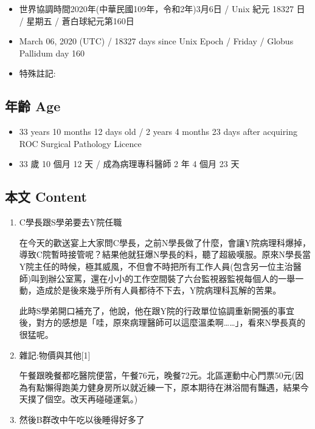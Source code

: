 \documentclass[a5paper, 12pt
]{book}
\providecommand{\tightlist}{%
  \setlength{\itemsep}{0pt}\setlength{\parskip}{0pt}}
\begin{document}
\begin{itemize}
\tightlist
\item
  世界協調時間2020年(中華民國109年，令和2年)3月6日 / Unix 紀元 18327 日
  / 星期五 / 蒼白球紀元第160日
\item
  March 06, 2020 (UTC) / 18327 days since Unix Epoch / Friday / Globus
  Pallidum day 160
\item
  特殊註記:
\end{itemize}

\hypertarget{ux5e74ux9f61-age-5}{%
\subsection{年齡 Age}\label{ux5e74ux9f61-age-5}}

\begin{itemize}
\tightlist
\item
  33 years 10 months 12 days old / 2 years 4 months 23 days after
  acquiring ROC Surgical Pathology Licence
\item
  33 歲 10 個月 12 天 / 成為病理專科醫師 2 年 4 個月 23 天
\end{itemize}

\hypertarget{ux672cux6587-content-5}{%
\subsection{本文 Content}\label{ux672cux6587-content-5}}

\begin{enumerate}
\def\labelenumi{\arabic{enumi}.}
\item
  C學長跟S學弟要去Y院任職

  在今天的歡送宴上大家問C學長，之前N學長做了什麼，會讓Y院病理科爆掉，導致C院暫時接管呢？結果他就狂爆N學長的料，聽了超級嘆服。原來N學長當Y院主任的時候，極其威風，不但會不時把所有工作人員(包含另一位主治醫師)叫到辦公室罵，還在小小的工作空間裝了六台監視器監視每個人的一舉一動，造成於是後來幾乎所有人員都待不下去，Y院病理科瓦解的苦果。

  此時S學弟開口補充了，他說，他在跟Y院的行政單位協調重新開張的事宜後，對方的感想是「哇，原來病理醫師可以這麼溫柔啊\ldots\ldots」，看來N學長真的很猛呢。
\item
  雜記:物價與其他{[}1{]}

  午餐跟晚餐都吃醫院便當，午餐76元，晚餐72元。北區運動中心門票50元(因為有點懶得跑美力健身房所以就近練一下，原本期待在淋浴間有豔遇，結果今天撲了個空。改天再碰碰運氣。)
\item
  然後B群改中午吃以後睡得好多了
\end{enumerate}
\end{document}
